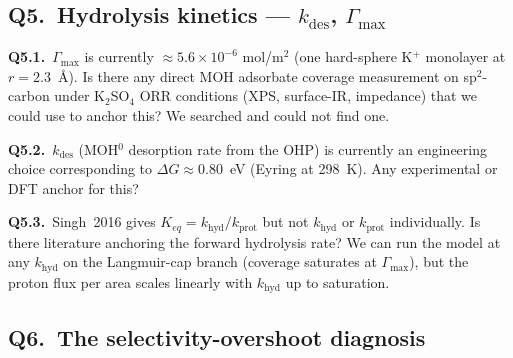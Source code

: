 \documentclass[11pt]{article}
\begin{document}
\subsection*{Q5.\ Hydrolysis kinetics --- $k_{\mathrm{des}}$, $\Gamma_{\max}$}

\begin{questionbox}
\textbf{Q5.1.}~$\Gamma_{\max}$ is currently $\approx 5.6\times 10^{-6}$
mol/m$^2$ (one hard-sphere K$^+$ monolayer at $r=2.3$~\AA).  Is there
any direct MOH adsorbate coverage measurement on sp$^2$-carbon under
K$_2$SO$_4$ ORR conditions (XPS, surface-IR, impedance) that we could
use to anchor this?  We searched and could not find one.

\textbf{Q5.2.}~$k_{\mathrm{des}}$ (MOH$^0$ desorption rate from the
OHP) is currently an engineering choice corresponding to
$\Delta G \approx 0.80$~eV (Eyring at 298~K).  Any experimental or
DFT anchor for this?

\textbf{Q5.3.}~Singh~2016 gives $K_{eq}=k_{\mathrm{hyd}}/k_{\mathrm{prot}}$
but not $k_{\mathrm{hyd}}$ or $k_{\mathrm{prot}}$ individually.  Is
there literature anchoring the forward hydrolysis rate?  We can run
the model at any $k_{\mathrm{hyd}}$ on the Langmuir-cap branch
(coverage saturates at $\Gamma_{\max}$), but the proton flux per area
scales linearly with $k_{\mathrm{hyd}}$ up to saturation.
\end{questionbox}

\subsection*{Q6.\ The selectivity-overshoot diagnosis}
\end{document}
